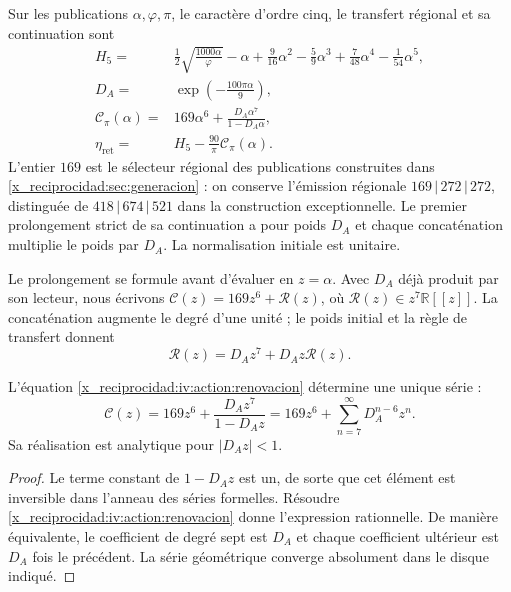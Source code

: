 \begin{definition}
\label{x_reciprocidad:iv:action:lectores}
Sur les publications \(\alpha,\varphi,\pi\), le caractère
d’ordre cinq, le transfert régional et sa continuation sont
\begin{align}
 H_5={}&\frac12\sqrt{\frac{1000\alpha}{\varphi}}-\alpha
       +\frac9{16}\alpha^2-\frac59\alpha^3
       +\frac7{48}\alpha^4-\frac1{54}\alpha^5,
       \label{x_reciprocidad:iv:action:h5}\\
 D_A={}&\exp\!\left(-\frac{100\pi\alpha}{9}\right),
       \label{x_reciprocidad:iv:action:da}\\
 \mathcal C_\pi(\alpha)={}&169\alpha^6+
       \frac{D_A\alpha^7}{1-D_A\alpha},
       \label{x_reciprocidad:iv:action:cpi}\\
 \eta_{\mathrm{ret}}={}&H_5-\frac{90}{\pi}\mathcal C_\pi(\alpha).
       \label{x_reciprocidad:iv:action:eta-ret}
\end{align}
L’entier \(169\) est le sélecteur régional des publications
construites dans \ref{x_reciprocidad:sec:generacion} : on conserve l’émission régionale
\(169\,|\,272\,|\,272\), distinguée de
\(418\,|\,674\,|\,521\) dans la construction exceptionnelle.
Le premier prolongement strict de sa continuation
a pour poids \(D_A\) et chaque concaténation multiplie le poids par
\(D_A\). La normalisation initiale est unitaire.
\end{definition}

Le prolongement se formule avant d’évaluer en \(z=\alpha\).
Avec \(D_A\) déjà produit par son lecteur, nous écrivons
\(\mathscr C(z)=169z^6+\mathscr R(z)\), où
\(\mathscr R(z)\in z^7\mathbb R[[z]]\).
La concaténation augmente le degré d’une unité ; le poids initial
et la règle de transfert donnent
\begin{equation}
 \mathscr R(z)=D_Az^7+D_Az\mathscr R(z).
 \label{x_reciprocidad:iv:action:renovacion}
\end{equation}

\begin{proposition}
\label{x_reciprocidad:iv:action:unicidad-renovacion}
L’équation \eqref{x_reciprocidad:iv:action:renovacion} détermine une unique série :
\begin{equation}
 \mathscr C(z)=169z^6+\frac{D_Az^7}{1-D_Az}
             =169z^6+\sum_{n=7}^{\infty}D_A^{n-6}z^n.
 \label{x_reciprocidad:iv:action:serie-renovacion}
\end{equation}
Sa réalisation est analytique pour \(|D_Az|<1\).
\end{proposition}
\begin{proof}
Le terme constant de \(1-D_Az\) est un, de sorte que cet
élément est inversible dans l’anneau des séries formelles.
Résoudre \eqref{x_reciprocidad:iv:action:renovacion} donne l’expression rationnelle.
De manière équivalente, le coefficient de degré sept est \(D_A\) et chaque
coefficient ultérieur est \(D_A\) fois le précédent. La série
géométrique converge absolument dans le disque indiqué.
\end{proof}

